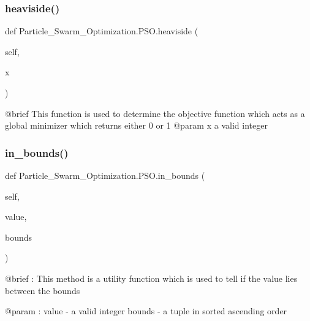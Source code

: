 \subsubsection{\texorpdfstring{heaviside()}{heaviside()}}
{\footnotesize\ttfamily def Particle\+\_\+\+Swarm\+\_\+\+Optimization.\+P\+S\+O.\+heaviside (\begin{DoxyParamCaption}\item[{}]{self,  }\item[{}]{x }\end{DoxyParamCaption})}

\begin{DoxyVerb}@brief  This function is used to determine the objective function which acts as a global minimizer which returns either 0 or 1
@param  x  a valid integer
\end{DoxyVerb}
 \hypertarget{class_particle___swarm___optimization_1_1_p_s_o_a810301f0aeba3b2e31dd5c5203b8b201}{}\label{class_particle___swarm___optimization_1_1_p_s_o_a810301f0aeba3b2e31dd5c5203b8b201} 
\subsubsection{\texorpdfstring{in\+\_\+bounds()}{in\_bounds()}}
{\footnotesize\ttfamily def Particle\+\_\+\+Swarm\+\_\+\+Optimization.\+P\+S\+O.\+in\+\_\+bounds (\begin{DoxyParamCaption}\item[{}]{self,  }\item[{}]{value,  }\item[{}]{bounds }\end{DoxyParamCaption})}

\begin{DoxyVerb}@brief : This method is a utility function which is used to tell if the value lies between the bounds

@param : value - a valid integer
   bounds - a tuple in sorted ascending order\end{DoxyVerb}
 \hypertarget{class_particle___swarm___optimization_1_1_p_s_o_a88adc64e6121ec070e2736145edabd4c}{}\label{class_particle___swarm___optimization_1_1_p_s_o_a88adc64e6121ec070e2736145edabd4c} 
